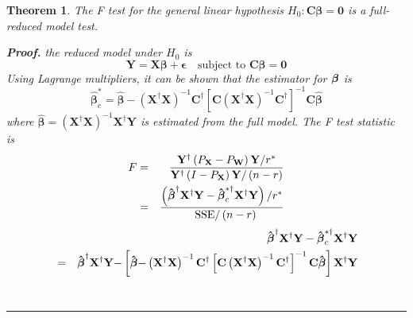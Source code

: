 \documentclass{article}
\newtheorem{theorem}{Theorem}
\newenvironment{proof}[1][Proof]{\noindent\textbf{#1.} }{\ \rule{0.5em}{0.5em}}
\begin{document}
\begin{theorem}
The F test for the general linear hypothesis $H_{0}:\mathbf{C\beta =0}$ is a
full-reduced model test.

\begin{proof}
the reduced model under $H_{0}$ is%
\begin{equation*}
\mathbf{Y=X\beta +\epsilon \quad }\text{subject to }\mathbf{C\beta =0}
\end{equation*}%
\newline
Using Lagrange multipliers, it can be shown that the estimator for $\mathbf{%
\beta }$ is%
\begin{equation*}
\mathbf{\hat{\beta}}_{c}^{\ast }=\mathbf{\hat{\beta}-}\left( \mathbf{X}%
^{\dagger }\mathbf{X}\right) ^{-1}\mathbf{C}^{\dagger }\left[ \mathbf{C}%
\left( \mathbf{X}^{\dagger }\mathbf{X}\right) ^{-1}\mathbf{C}^{\dagger }%
\right] ^{-1}\mathbf{C\hat{\beta}}
\end{equation*}%
where $\mathbf{\hat{\beta}=}\left( \mathbf{X}^{\dagger }\mathbf{X}\right)
^{-1}\mathbf{X}^{\dagger }\mathbf{Y}$ is estimated from the full model.%
\newline
\newline
The F test statistic is%
\begin{eqnarray*}
F &=&\frac{\mathbf{Y}^{\dagger }\left( P_{\mathbf{X}}-P_{\mathbf{W}}\right) 
\mathbf{Y/}r^{\ast }}{\mathbf{Y}^{\dagger }\left( I-P_{\mathbf{X}}\right) 
\mathbf{Y/}\left( n-r\right) } \\
&=&\frac{\left( \mathbf{\hat{\beta}}^{\dagger }\mathbf{X^{\dagger }Y-\hat{%
\beta}}_{c}^{\ast \dagger }\mathbf{X^{\dagger }Y}\right) /r^{\ast }}{\text{%
SSE}/\left( n-r\right) }
\end{eqnarray*}%
\begin{eqnarray*}
&&\mathbf{\hat{\beta}}^{\dagger }\mathbf{X^{\dagger }Y-\hat{\beta}}%
_{c}^{\ast \dagger }\mathbf{X^{\dagger }Y} \\
&=&\mathbf{\hat{\beta}}^{\dagger }\mathbf{X^{\dagger }Y-}\left[ \mathbf{\hat{%
\beta}-}\left( \mathbf{X}^{\dagger }\mathbf{X}\right) ^{-1}\mathbf{C}%
^{\dagger }\left[ \mathbf{C}\left( \mathbf{X}^{\dagger }\mathbf{X}\right)
^{-1}\mathbf{C}^{\dagger }\right] ^{-1}\mathbf{C\hat{\beta}}\right] \mathbf{%
X^{\dagger }Y}
\end{eqnarray*}
\end{proof}
\end{theorem}
\end{document}
